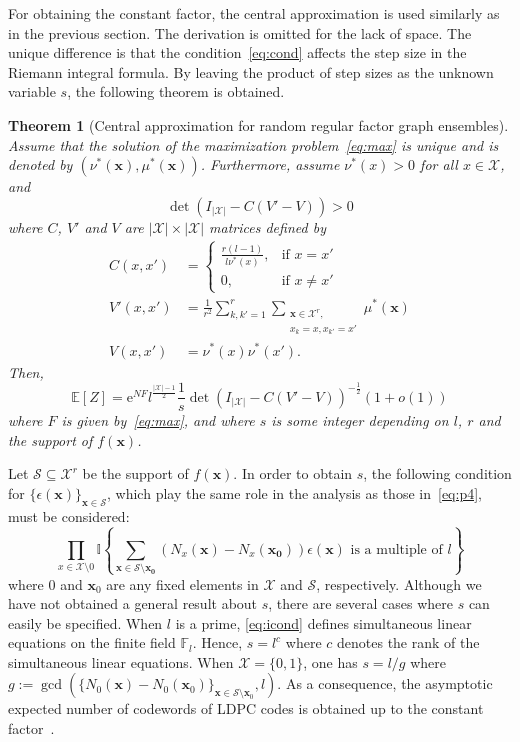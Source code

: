 \documentclass[conference,twocolumns]{IEEEtran}
\theoremstyle{plain}
\newtheorem{theorem}{Theorem}
\begin{document}
For obtaining the constant factor, the central approximation is used similarly as in the previous section.
The derivation is omitted for the lack of space.
The unique difference is that the condition~\eqref{eq:cond} affects the step size in the Riemann integral formula.
By leaving the product of step sizes as the unknown variable $s$, the following theorem is obtained.
\begin{theorem}[Central approximation for random regular factor graph ensembles]\label{thm:rg}
Assume that the solution of the maximization problem~\eqref{eq:max} is unique and is denoted by $(\nu^*(\bm{x}),\mu^*(\bm{x}))$.
Furthermore, assume $\nu^*(x)>0$ for all $x\in\mathcal{X}$, and 
\begin{equation*}
\det\left(I_{|\mathcal{X}|}-C(V'-V)\right)>0
\end{equation*}
where $C$, $V'$ and $V$ are $|\mathcal{X}|\times |\mathcal{X}|$ matrices defined by
\begin{align*}
C(x,x')&=\begin{cases}
\frac{r(l-1)}{l\nu^*(x)},&\text{if } x=x'\\
0,&\text{if } x \ne x'
\end{cases}\\
V'(x,x') &= \frac1{r^2}\sum_{k,k'=1}^r\sum_{\substack{\bm{x}\in\mathcal{X}^r,\\ x_k=x, x_{k'}=x'}}\mu^*(\bm{x})\\
V(x,x') &= \nu^*(x)\nu^*(x').
\end{align*}
Then,
\begin{equation*}
\mathbb{E}[Z]= 
\mathrm{e}^{NF}l^{\frac{|\mathcal{X}|-1}2}\frac1{s}\det\left(I_{|\mathcal{X}|}-C(V'-V)\right)^{-\frac12}
(1+o(1))
\end{equation*}
where $F$ is given by~\eqref{eq:max},
and where $s$ is some integer depending on $l$, $r$ and the support of $f(\bm{x})$.
\end{theorem}

Let $\mathcal{S}\subseteq\mathcal{X}^r$ be the support of $f(\bm{x})$.
In order to obtain $s$, the following condition for $\{\epsilon(\bm{x})\}_{\bm{x}\in\mathcal{S}}$, which play the same role in the analysis as those in~\eqref{eq:p4}, must be considered:
\begin{equation}\label{eq:icond}
\prod_{x\in\mathcal{X}\setminus 0}\mathbb{I}\left\{\sum_{\bm{x}\in\mathcal{S}\setminus\bm{x_0}}\left(N_x(\bm{x})-N_x(\bm{x_0})\right) \epsilon(\bm{x})
 \text{ is a multiple of } l\right\}
\end{equation}
where 0 and $\bm{x}_0$ are any fixed elements in $\mathcal{X}$ and $\mathcal{S}$, respectively.
Although we have not obtained a general result about $s$,
there are several cases where $s$ can easily be specified.
When $l$ is a prime, \eqref{eq:icond} defines simultaneous linear equations on the finite field $\mathbb{F}_l$.
Hence, $s=l^{c}$ where $c$ denotes the rank of the simultaneous linear equations.
When $\mathcal{X}=\{0,1\}$, one has 
$s = l/g$ where $g:=\gcd(\{N_0(\bm{x})-N_0(\bm{x}_0)\}_{\bm{x}\in\mathcal{S}\setminus \bm{x}_0},l)$.
As a consequence, the asymptotic expected number of codewords of LDPC codes is obtained up to the constant factor~\cite{1715529}.
\end{document}
